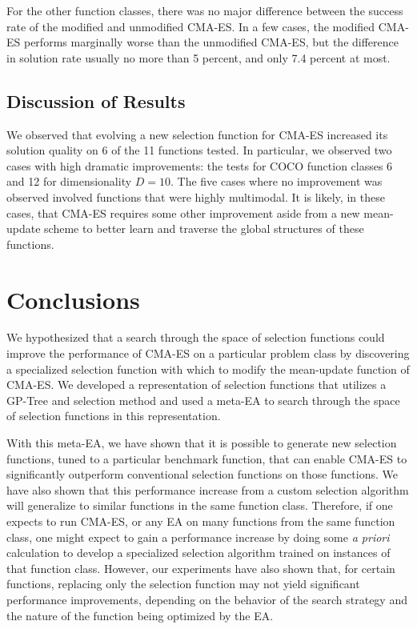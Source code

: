 \documentclass[sigconf]{acmart}
\begin{document}
For the other function classes, there was no major difference between the success rate of the modified and unmodified CMA-ES. In a few cases, the modified CMA-ES performs marginally worse than the unmodified CMA-ES, but the difference in solution rate usually no more than 5 percent, and only 7.4 percent at most.

\subsection{Discussion of Results}
\label{resultsDiscussion}

We observed that evolving a new selection function for CMA-ES increased its solution quality on 6 of the 11 functions tested. In particular, we observed two cases with high dramatic improvements: the tests for COCO function classes 6 and 12 for dimensionality $D=10$. The five cases where no improvement was observed involved functions that were highly multimodal. It is likely, in these cases, that CMA-ES requires some other improvement aside from a new mean-update scheme to better learn and traverse the global structures of these functions. 

\section{Conclusions}
\label{Conclusion}
We hypothesized that a search through the space of selection functions could improve the performance of CMA-ES on a particular problem class by discovering a specialized selection function with which to modify the mean-update function of CMA-ES. We developed a representation of selection functions that utilizes a GP-Tree and selection method and used a meta-EA to search through the space of selection functions in this representation.

With this meta-EA, we have shown that it is possible to generate new selection functions, tuned to a particular benchmark function, that can enable CMA-ES to significantly outperform conventional selection functions on those functions. We have also shown that this performance increase from a custom selection algorithm will generalize to similar functions in the same function class. Therefore, if one expects to run CMA-ES, or any EA on many functions from the same function class, one might expect to gain a performance increase by doing some \textit{a priori} calculation to develop a specialized selection algorithm trained on instances of that function class. However, our experiments have also shown that, for certain functions, replacing only the selection function may not yield significant performance improvements, depending on the behavior of the search strategy and the nature of the function being optimized by the EA. 
\end{document}
